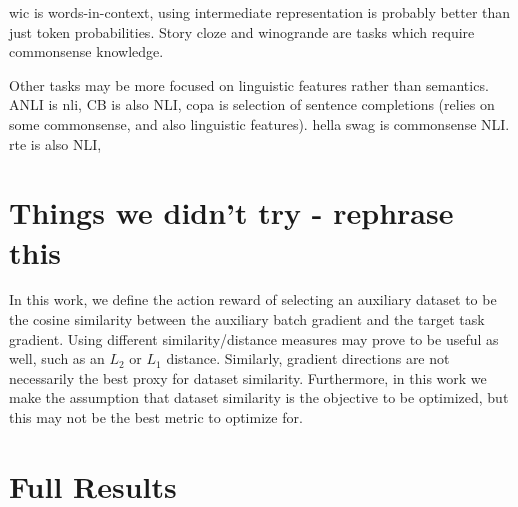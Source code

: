 wic is words-in-context, using intermediate representation is probably better than just token probabilities.
Story cloze and winogrande are tasks which require commonsense knowledge.

Other tasks may be more focused on linguistic features rather than semantics. ANLI is nli, CB is also NLI, copa is selection of sentence completions (relies on some commonsense, and also linguistic features). hella swag is commonsense NLI. rte is also NLI, 


\section{Things we didn't try - rephrase this}
In this work, we define the action reward of selecting an auxiliary dataset to be the cosine similarity between the auxiliary batch gradient and the target task gradient. Using different similarity/distance measures may prove to be useful as well, such as an $L_{2}$ or $L_{1}$ distance. Similarly, gradient directions are not necessarily the best proxy for dataset similarity. Furthermore, in this work we make the assumption that dataset similarity is the objective to be optimized, but this may not be the best metric to optimize for.

\section{Full Results}
\label{sec:appendix_results}


